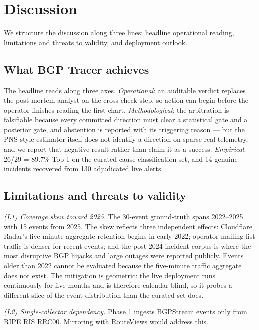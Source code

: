 \section{Discussion}
\label{sec:discuss}

We structure the discussion along three lines: headline operational reading, limitations and threats to validity, and deployment outlook.

\subsection{What BGP Tracer achieves}

The headline reads along three axes. \emph{Operational}: an auditable verdict replaces the post-mortem analyst on the cross-check step, so action can begin before the operator finishes reading the first chart. \emph{Methodological}: the arbitration is falsifiable because every committed direction must clear a statistical gate and a posterior gate, and abstention is reported with its triggering reason --- but the PNS-style estimator itself does not identify a direction on sparse real telemetry, and we report that negative result rather than claim it as a success. \emph{Empirical}: 26/29 = 89.7\% Top-1 on the curated cause-classification set, and 14 genuine incidents recovered from 130 adjudicated live alerts.

\subsection{Limitations and threats to validity}

\textit{(L1) Coverage skew toward 2025.} The 30-event ground-truth spans 2022--2025 with 15 events from 2025. The skew reflects three independent effects: Cloudflare Radar's five-minute aggregate retention begins in early 2022; operator mailing-list traffic is denser for recent events; and the post-2024 incident corpus is where the most disruptive BGP hijacks and large outages were reported publicly. Events older than 2022 cannot be evaluated because the five-minute traffic aggregate does not exist. The mitigation is geometric: the live deployment runs continuously for five months and is therefore calendar-blind, so it probes a different slice of the event distribution than the curated set does.

\textit{(L2) Single-collector dependency.} Phase 1 ingests BGPStream events only from RIPE RIS RRC00. Mirroring with RouteViews would address this.

